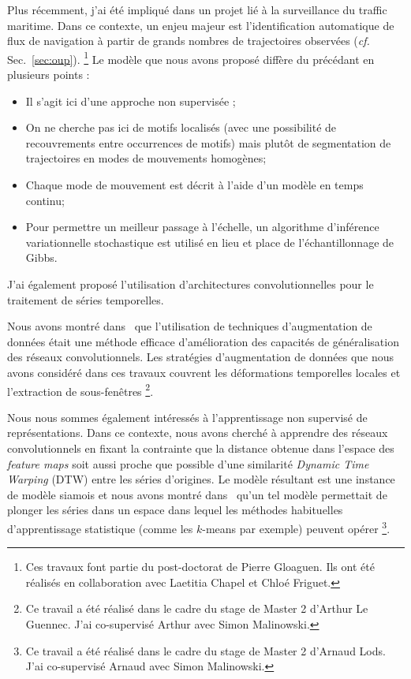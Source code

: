Plus récemment, j'ai été impliqué dans un projet lié à la surveillance du
traffic maritime.
Dans ce contexte, un enjeu majeur est l'identification automatique de flux de
navigation à partir de grands nombres de trajectoires observées (\emph{cf.}
Sec.~\ref{sec:oup}).%
\footnote{Ces travaux font partie du post-doctorat de Pierre Gloaguen.
Ils ont été réalisés en collaboration avec Laetitia Chapel et Chloé Friguet.}
Le modèle que nous avons proposé diffère du précédant en plusieurs points :

\begin{itemize}
\item Il s'agit ici d'une approche non supervisée ;
\item On ne cherche pas ici de motifs localisés (avec une possibilité de
recouvrements entre occurrences de motifs) mais plutôt de segmentation
de trajectoires en modes de mouvements homogènes;
\item Chaque mode de mouvement est décrit à l'aide d'un modèle en temps continu;
\item Pour permettre un meilleur passage à l'échelle, un algorithme d'inférence
variationnelle stochastique est utilisé en lieu et place de l'échantillonnage
de Gibbs.
\end{itemize}

\haveabreak{}

J'ai également proposé l'utilisation d'architectures convolutionnelles pour le
traitement de séries temporelles.

Nous avons montré dans~\cite{leguennec:halshs-01357973} que l'utilisation de
techniques d'augmentation de données était une méthode efficace d'amélioration
des capacités de généralisation des réseaux convolutionnels.
Les stratégies d'augmentation de données que nous avons considéré dans ces
travaux couvrent les déformations temporelles locales et l'extraction de
sous-fenêtres%
\footnote{Ce travail a été réalisé dans le cadre du stage de Master 2 d'Arthur
Le Guennec.
J'ai co-supervisé Arthur avec Simon Malinowski.}.

Nous nous sommes également intéressés à l'apprentissage non supervisé de
représentations.
Dans ce contexte, nous avons cherché à apprendre des réseaux convolutionnels
en fixant la contrainte que la distance obtenue dans l'espace des
\emph{feature maps} soit aussi proche que possible d'une similarité
\emph{Dynamic Time Warping} (DTW) entre les séries d'origines.
Le modèle résultant est une instance de modèle siamois et nous avons montré
dans~\cite{lods:hal-01565207} qu'un tel modèle permettait de plonger les séries
dans un espace dans lequel les méthodes habituelles d'apprentissage statistique
(comme les $k$-means par exemple) peuvent opérer%
\footnote{Ce travail a été réalisé dans le cadre du stage de Master 2 d'Arnaud
Lods.
J'ai co-supervisé Arnaud avec Simon Malinowski.}.

